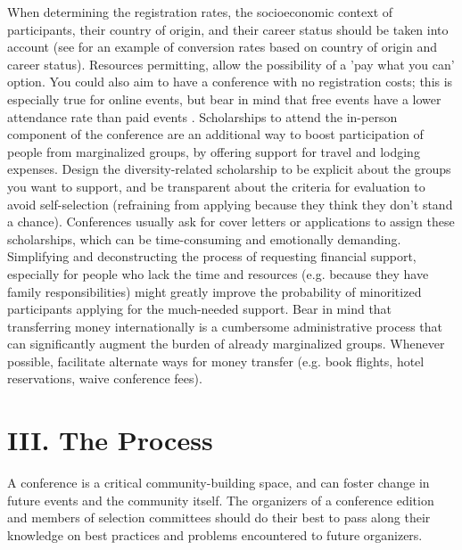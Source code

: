 \documentclass[10pt,letterpaper]{article}
\begin{document}
When determining the registration rates, the socioeconomic context of participants, their country of origin, and their career status should be taken into account  \cite{sarabipourChangingScientificMeetings2021, andalibPostdocQueueLabour2018, kaplanPostdocNot2012}
(see \cite{canelon2021cost} for an example of conversion rates based on country of origin and career status). 
Resources permitting, allow the possibility of a 'pay what you can' option. You could also aim to have a conference with no registration costs; this is especially true for online events, but bear in mind that free events have a lower attendance rate than paid events \cite{eventbrite_ultimate_2017}. 
Scholarships to attend the in-person component of the conference are an additional way to boost participation of people from marginalized groups, by offering support for travel and lodging expenses.
Design the diversity-related scholarship to be explicit about the groups you want to support, and be transparent about the criteria for evaluation to avoid self-selection (refraining from applying because they think they don't stand a chance). 
Conferences usually ask for cover letters or applications to assign these scholarships, which can be time-consuming and emotionally demanding. 
 Simplifying and deconstructing the process of requesting financial support, especially for 
people who lack the time and resources (e.g. because they have family responsibilities) might greatly improve the probability of minoritized participants applying for the much-needed support. 
Bear in mind that transferring money internationally is a cumbersome administrative process that can significantly augment the burden of already marginalized groups. Whenever possible, facilitate alternate ways for money transfer (e.g. book flights, hotel reservations, waive conference fees).



\section*{III. The Process}

A conference is a critical community-building space, and can foster change in future events and the community itself. The organizers of a conference edition and members of selection committees should do their best to pass along their knowledge on best practices and problems encountered to future organizers.
\end{document}
